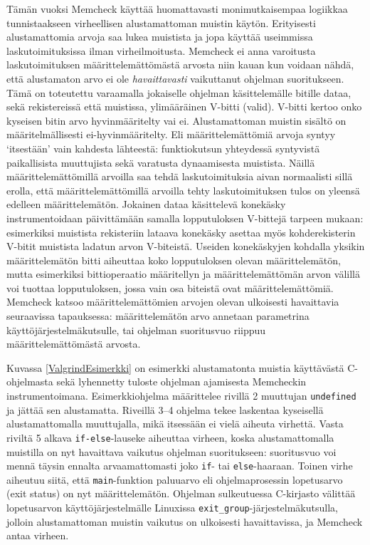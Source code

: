 Tämän vuoksi Memcheck käyttää huomattavasti monimutkaisempaa logiikkaa tunnistaakseen virheellisen alustamattoman muistin käytön.
Erityisesti alustamattomia arvoja saa lukea muistista ja jopa käyttää useimmissa laskutoimituksissa ilman virheilmoitusta.
Memcheck ei anna varoitusta laskutoimituksen määrittelemättömästä arvosta niin kauan kun voidaan nähdä,
että alustamaton arvo ei ole \emph{havaittavasti} vaikuttanut ohjelman suoritukseen.
Tämä on toteutettu varaamalla jokaiselle ohjelman käsittelemälle bitille dataa, sekä rekistereissä että muistissa, ylimääräinen V-bitti (valid).
V-bitti kertoo onko kyseisen bitin arvo hyvinmääritelty vai ei.
Alustamattoman muistin sisältö on määritelmällisesti ei-hyvinmääritelty.
Eli määrittelemättömiä arvoja syntyy `itsestään' vain kahdesta lähteestä:
funktiokutsun yhteydessä syntyvistä paikallisista muuttujista sekä varatusta dynaamisesta muistista.
Näillä määrittelemättömillä arvoilla saa tehdä laskutoimituksia aivan normaalisti
sillä erolla, että määrittelemättömillä arvoilla tehty laskutoimituksen tulos on yleensä edelleen määrittelemätön.
Jokainen dataa käsittelevä konekäsky instrumentoidaan päivittämään samalla lopputuloksen V-bittejä tarpeen mukaan:
esimerkiksi muistista rekisteriin lataava konekäsky asettaa myös kohderekisterin V-bitit muistista ladatun arvon V-biteistä.
Useiden konekäskyjen kohdalla yksikin määrittelemätön bitti aiheuttaa koko lopputuloksen olevan määrittelemätön,
mutta esimerkiksi bittioperaatio määritellyn ja määrittelemättömän arvon välillä voi tuottaa lopputuloksen,
jossa vain osa biteistä ovat määrittelemättömiä.
Memcheck katsoo määrittelemättömien arvojen olevan ulkoisesti havaittavia seuraavissa tapauksessa:
määrittelemätön arvo annetaan parametrina käyttöjärjestelmäkutsulle,
tai ohjelman suoritusvuo riippuu määrittelemättömästä arvosta.

Kuvassa \ref{ValgrindEsimerkki} on esimerkki alustamatonta muistia käyttävästä C-ohjelmasta
sekä lyhennetty tuloste ohjelman ajamisesta Memcheckin instrumentoimana.
Esimerkkiohjelma määrittelee rivillä 2 muuttujan \texttt{undefined} ja jättää sen alustamatta.
Riveillä 3--4 ohjelma tekee laskentaa kyseisellä alustamattomalla muuttujalla,
mikä itsessään ei vielä aiheuta virhettä.
Vasta riviltä 5 alkava \texttt{if-else}-lauseke aiheuttaa virheen,
koska alustamattomalla muistilla on nyt havaittava vaikutus ohjelman suoritukseen:
suoritusvuo voi mennä täysin ennalta arvaamattomasti joko \texttt{if}- tai \texttt{else}-haaraan.
Toinen virhe aiheutuu siitä,
että \texttt{main}-funktion paluuarvo eli ohjelmaprosessin lopetusarvo (exit status)
on nyt määrittelemätön.
Ohjelman sulkeutuessa C-kirjasto välittää lopetusarvon käyttöjärjestelmälle
Linuxissa \texttt{exit\_group}-järjestelmäkutsulla,
jolloin alustamattoman muistin vaikutus on ulkoisesti havaittavissa,
ja Memcheck antaa virheen.

